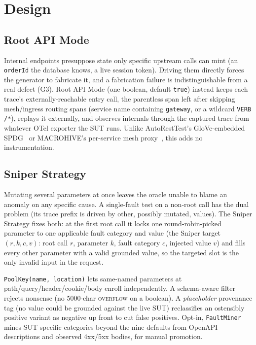 \documentclass[sigconf,screen,review]{acmart}
\begin{document}
\section{Design}\label{sec:innov}

\subsection{Root API Mode}\label{sec:rootmode}

Internal endpoints presuppose state only specific upstream calls can mint (an \texttt{orderId} the database knows, a live session token). Driving them directly forces the generator to fabricate it, and a fabrication failure is indistinguishable from a real defect (G3). Root API Mode (one boolean, default \texttt{true}) instead keeps each trace's externally-reachable entry call, the parentless span left after skipping mesh/ingress routing spans (service name containing \texttt{gateway}, or a wildcard \texttt{VERB /*}), replays it externally, and observes internals through the captured trace from whatever OTel exporter the SUT runs. Unlike AutoRestTest's GloVe-embedded SPDG~\cite{Stennett2025AutoRestTest} or MACROHIVE's per-service mesh proxy~\cite{Giamattei2022MACROHIVE}, this adds no instrumentation.

\subsection{Sniper Strategy}\label{sec:sniper}

Mutating several parameters at once leaves the oracle unable to blame an anomaly on any specific cause. A single-fault test on a non-root call has the dual problem (its trace prefix is driven by other, possibly mutated, values). The Sniper Strategy fixes both: at the first root call it locks one round-robin-picked parameter to one applicable fault category and value (the Sniper target $(r,k,c,v)$: root call $r$, parameter $k$, fault category $c$, injected value $v$) and fills every other parameter with a valid grounded value, so the targeted slot is the only invalid input in the request.

\texttt{PoolKey(name, location)} lets same-named parameters at path/query/header/cookie/body enroll independently. A schema-aware filter rejects nonsense (no 5000-char \textsc{overflow} on a boolean). A \emph{placeholder} provenance tag (no value could be grounded against the live SUT) reclassifies an ostensibly positive variant as negative up front to cut false positives. Opt-in, \texttt{FaultMiner} mines SUT-specific categories beyond the nine defaults from OpenAPI descriptions and observed 4xx/5xx bodies, for manual promotion.
\end{document}
